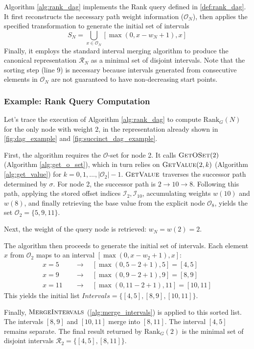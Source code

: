 Algorithm \ref{alg:rank_dag} implements the Rank query defined in \ref{def:rank_dag}. It first reconstructs the necessary path weight information ($\mathcal{O}_N$), then applies the specified transformation to generate the initial set of intervals
\[S_N = \bigcup_{x \in \mathcal{O}_N} [ \max(0, x - w_N + 1), x ]\]
Finally, it employs the standard interval merging algorithm to produce the canonical representation $\mathcal{R}_N$ as a minimal set of disjoint intervals. Note that the sorting step (line 9) is necessary because intervals generated from consecutive elements in $\mathcal{O}_N$ are not guaranteed to have non-decreasing start points.

\subsubsection*{Example: Rank Query Computation \label{subsubsec:rank_query_example_node2}}

Let's trace the execution of Algorithm \ref{alg:rank_dag} to compute $\mathrm{Rank}_G(N)$ for the only node with weight $2$, in the representation already shown in \autoref{fig:dag_example} and \autoref{fig:succinct_dag_example}.

First, the algorithm requires the $\mathcal{O}$-set for node 2. It calls $\textsc{GetOSet}(2)$ (Algorithm \ref{alg:get_o_set}), which in turn relies on $\textsc{GetValue}(2, k)$ (Algorithm \ref{alg:get_value}) for $k=0, 1, \dots, |\mathcal{O}_2|-1$. $\textsc{GetValue}$ traverses the successor path determined by $\sigma$. For node 2, the successor path is $2 \to 10 \to 8$. Following this path, applying the stored offset indices $\mathcal{I}_2, \mathcal{I}_{10}$, accumulating weights $w(10)$ and $w(8)$, and finally retrieving the base value from the explicit node $\mathcal{O}_8$, yields the set $\mathcal{O}_2 = \{5, 9, 11\}$.

Next, the weight of the query node is retrieved: $w_N = w(2) = 2$.

The algorithm then proceeds to generate the initial set of intervals. Each element $x$ from $\mathcal{O}_2$ maps to an interval $[\max(0, x - w_2 + 1), x]$:
\begin{align*}
    x=5 \quad  & \longrightarrow \quad [\max(0, 5 - 2 + 1), 5] = [4, 5]     \\
    x=9 \quad  & \longrightarrow \quad [\max(0, 9 - 2 + 1), 9] = [8, 9]     \\
    x=11 \quad & \longrightarrow \quad [\max(0, 11 - 2 + 1), 11] = [10, 11]
\end{align*}
This yields the initial list $Intervals = \{ [4, 5], [8, 9], [10, 11] \}$.

Finally, $\textsc{MergeIntervals}$ (\ref{alg:merge_intervals}) is applied to this sorted list. The intervals $[8, 9]$ and $[10, 11]$ merge into $[8, 11]$. The interval $[4, 5]$ remains separate. The final result returned by $\mathrm{Rank}_G(2)$ is the minimal set of disjoint intervals $\mathcal{R}_2 = \{ [4, 5], [8, 11] \}$.
